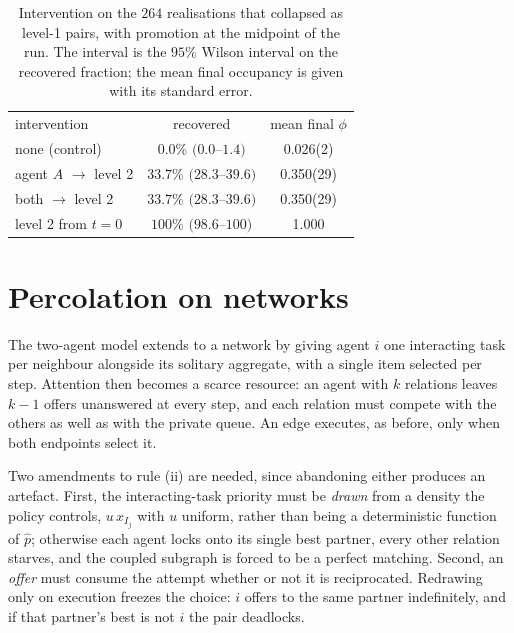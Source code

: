 \documentclass[aps,pre,twocolumn,superscriptaddress,floatfix,longbibliography]{revtex4-2}
\begin{document}
\begin{table}[t]
\caption{Intervention on the $264$ realisations that collapsed
as level-1 pairs, with promotion at the midpoint of the run. The interval
is the $95\%$ Wilson interval on the recovered fraction; the mean final
occupancy is given with its standard error.}
\label{tab:rescue}
\begin{ruledtabular}
\begin{tabular}{lcc}
intervention & recovered & mean final $\phi$ \\
\colrule
none (control)            & $0.0\%$ $(0.0$--$1.4)$     & 0.026(2) \\
agent $A$ $\to$ level 2   & $33.7\%$ $(28.3$--$39.6)$  & 0.350(29) \\
both $\to$ level 2        & $33.7\%$ $(28.3$--$39.6)$  & 0.350(29) \\
level 2 from $t=0$        & $100\%$ $(98.6$--$100)$    & 1.000 \\
\end{tabular}
\end{ruledtabular}
\end{table}

\section{Percolation on networks}
\label{sec:networks}

The two-agent model extends to a network by giving agent $i$ one interacting
task per neighbour alongside its solitary aggregate, with a single item selected
per step. Attention then becomes a scarce resource: an agent with $k$ relations
leaves $k-1$ offers unanswered at every step, and each relation must compete
with the others as well as with the private queue. An edge executes, as before,
only when both endpoints select it.

Two amendments to rule (ii) are needed, since abandoning either produces an
artefact. First, the interacting-task priority must be \emph{drawn} from a
density the policy controls, $u\,x_{I_j}$ with $u$ uniform, rather than being a
deterministic function of $\hat p$; otherwise each agent locks onto its single
best partner, every other relation starves, and the coupled subgraph is forced
to be a perfect matching. Second, an \emph{offer} must consume the attempt
whether or not it is reciprocated. Redrawing only on execution freezes the
choice: $i$ offers to the same partner indefinitely, and if that partner's best
is not $i$ the pair deadlocks.
\end{document}
